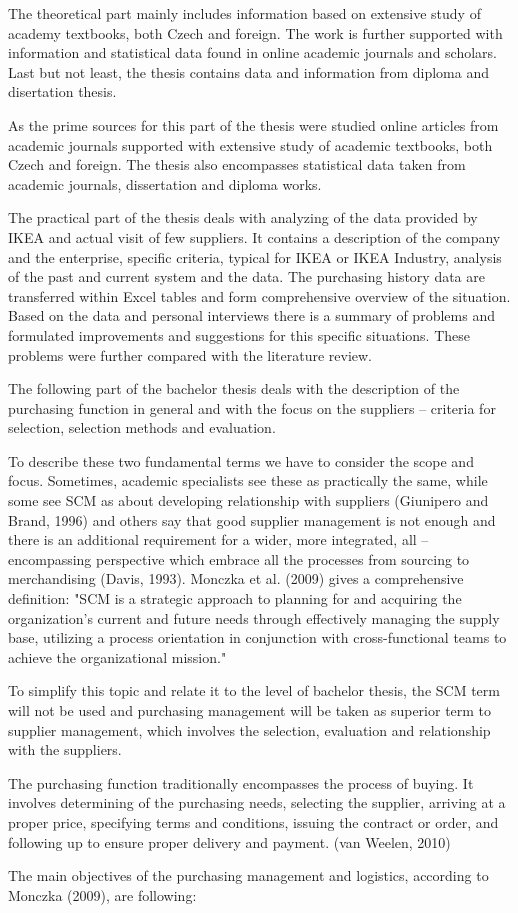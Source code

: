 \documentclass[oneside,12pt]{article}%
\begin{document}
The theoretical part mainly includes information based on extensive study of academy textbooks, both Czech and foreign. The work is further supported with information and statistical data found in online academic journals and scholars. Last but not least, the thesis contains data and information from diploma and disertation thesis. \par
As the prime sources for this part of the thesis were studied online articles from academic journals supported with extensive study of academic textbooks, both Czech and foreign. The thesis also encompasses statistical data taken from academic journals, dissertation and diploma works. \par
The practical part of the thesis deals with analyzing of the data provided by IKEA and actual visit of few suppliers. It contains a description of the company and the enterprise, specific criteria, typical for IKEA or IKEA Industry, analysis of the past and current system and the data. The purchasing history data are transferred within Excel tables and form comprehensive overview of the situation. Based on the data and personal interviews there is a summary of problems and formulated improvements and suggestions for this specific situations. These problems were further compared with the literature review.

The following part of the bachelor thesis deals with the description of the purchasing function in general and with the focus on the suppliers – criteria for selection, selection methods and evaluation.

To describe these two fundamental terms we have to consider the scope and focus. Sometimes, academic specialists see these as practically the same, while some see SCM as about developing relationship with suppliers (Giunipero and Brand, 1996) and others say that good supplier management is not enough and there is an additional requirement for a wider, more integrated, all – encompassing perspective which embrace all the processes from sourcing to merchandising (Davis, 1993). Monczka et al. (2009) gives a comprehensive definition: "SCM is a strategic approach to planning for and acquiring the organization’s current and future needs through effectively managing the supply base, utilizing a process orientation in conjunction with cross-functional teams to achieve the organizational mission." \par
To simplify this topic and relate it to the level of bachelor thesis, the SCM term will not be used and purchasing management will be taken as superior term to supplier management, which involves the selection, evaluation and relationship with the suppliers.\par
The purchasing function traditionally encompasses the process of buying. It involves determining of the purchasing needs, selecting the supplier, arriving at a proper price, specifying terms and conditions, issuing the contract or order, and following up to ensure proper delivery and payment. (van Weelen, 2010) \par
The main objectives of the purchasing management and logistics, according to Monczka (2009), are following:
\end{document}
